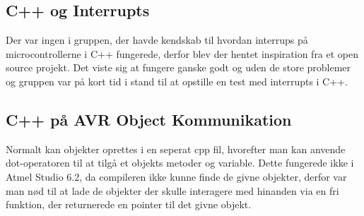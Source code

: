 \subsection{C++ og Interrupts}
Der var ingen i gruppen, der havde kendskab til hvordan interrups på microcontrollerne i C++ fungerede, derfor blev der hentet inspiration fra et open source projekt\cite{lib:waterproofman}. Det viste sig at fungere ganske godt og uden de store problemer og gruppen var på kort tid i stand til at opstille en test med interrupts i C++.

\subsection{C++ på AVR Object Kommunikation}
Normalt kan objekter oprettes i en seperat cpp fil, hvorefter man kan anvende dot-operatoren til at tilgå et objekts metoder og variable. Dette fungerede ikke i Atmel Studio 6.2, da compileren ikke kunne finde de givne objekter, derfor var man nød til at lade de objekter der skulle interagere med hinanden via en fri funktion, der returnerede en pointer til det givne objekt.

\clearpage